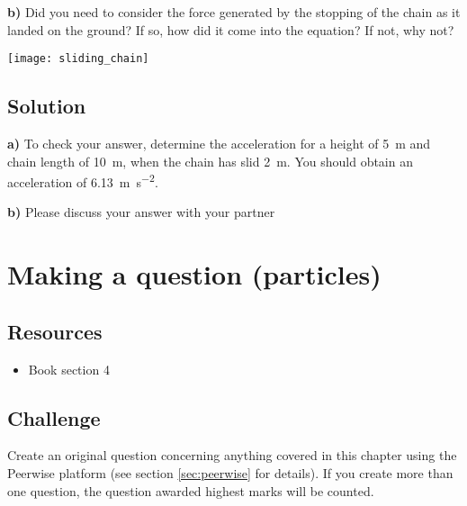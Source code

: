 \textbf{b)} Did you need to consider the force generated by the stopping of the chain as it landed on the ground? If so, how did it come into the equation? If not, why not?

\texttt{[image: sliding\_chain]}

\subsection*{Solution}
\textbf{a)} To check your answer, determine the acceleration for a height of \SI{5}{\meter} and chain length of \SI{10}{\meter}, when the chain has slid \SI{2}{m}. You should obtain an acceleration of \SI{6.13}{\meter\per\square\second}.

\textbf{b)} Please discuss your answer with your partner



\newpage
\section{Making a question (particles)}


\subsection*{Resources}
\begin{itemize}
    \item Book section 4
\end{itemize}

\subsection*{Challenge}
Create an original question concerning anything covered in this chapter using the Peerwise platform (see section \ref{sec:peerwise} for details). If you create more than one question, the question awarded highest marks will be counted.

